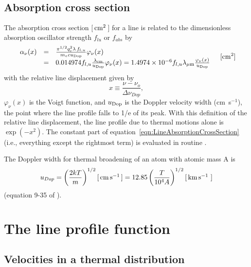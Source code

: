 \subsection{Absorption cross section}

The absorption cross section [$\mbox{${\rm\thinspace cm}^{2}\,$}$] for a line is related to the
dimensionless absorption oscillator strength $f_{lu}$ or $f_{abs}$ by
\begin{equation}
\label{eqn:LineAbsorptionCrossSection}
\begin{array}{ccl}
 {\alpha _\nu(x) }& =& \frac{{{\pi ^{1/2}}q_e^2\lambda
\,{f_{l,u}}}}{{{m_e}c{u_{\rm Dop}}}}{\varphi _\nu }(x) \\
& =& 0.014974{f_{l,u}}\frac{{{\lambda_{\rm cm}}}}{{{u_{\rm Dop}}}}{\varphi _\nu
}(x) = 1.4974 \times {10^{ - 6}}{f_{l,u}}\lambda_{\mu\rm m}\frac{\varphi_\nu(x)}{u_{\rm Dop}} \\
 \end{array}
\quad [\mathrm{cm}^2]
\end{equation}
with the relative line displacement given by
\begin{equation}
\label{eqn:RelativelineDisplacement}
x \equiv \frac{{\nu  - {\nu _o}}}{{\Delta {\nu _{Dop}}}} ,
\end{equation}
${\varphi _\nu }\left( x \right)$
is the Voigt function, and $u_{\rm Dop}$ is the Doppler velocity width
(cm~s$^{-1}$), the
point where the line profile falls to 1/e of its peak.
With this definition
of the relative line displacement, the line profile due to thermal motions
alone is $\exp(-x^2)$.
The constant part of equation~\ref{eqn:LineAbsorptionCrossSection}
(i.e., everything except the rightmost term) is evaluated
in routine .

The Doppler width for thermal broadening of an atom with atomic mass A is
\begin{equation}
u_{Dop} = \left ( \frac{2kT}{m} \right )^{1/2} [\mbox{${\rm\thinspace cm}{\rm\thinspace s}^{-1}\,$} ] = 
12.85 \left ( \frac{T}{10^4 A} \right )^{1/2} [\mbox{${\rm\thinspace km}\mbox{${\rm\thinspace s}^{-1}\,$}\,$} ]
\end{equation}
(equation 9-35 of \cite{1970stat.book.....M}).

\section{The line profile function}

\subsection{Velocities in a thermal distribution}

